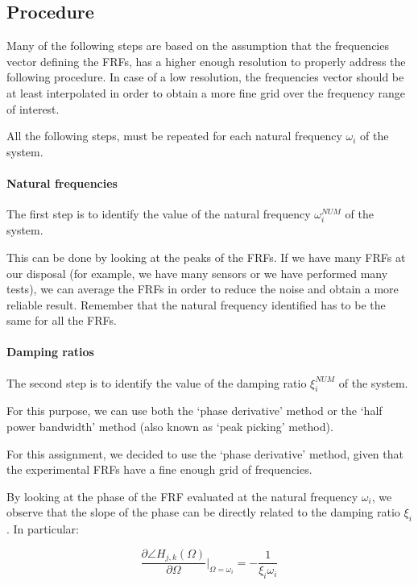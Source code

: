 \subsection{Procedure}
\label{subsec:procedure}

Many of the following steps are based on the assumption that the frequencies vector defining the FRFs, has a higher enough resolution to properly address the following procedure.
In case of a low resolution, the frequencies vector should be at least interpolated in order to obtain a more fine grid over the frequency range of interest.

All the following steps, must be repeated for each natural frequency $\omega_i$ of the system.

\paragraph{Natural frequencies}

The first step is to identify the value of the natural frequency $\omega_i^{NUM}$ of the system.

This can be done by looking at the peaks of the FRFs.
If we have many FRFs at our disposal (for example, we have many sensors or we have performed many tests), we can average the FRFs in order to reduce the noise and obtain a more reliable result.
Remember that the natural frequency identified has to be the same for all the FRFs.

\paragraph{Damping ratios}

The second step is to identify the value of the damping ratio $\xi_i^{NUM}$ of the system.

For this purpose, we can use both the `phase derivative' method or the `half power bandwidth' method (also known as `peak picking' method).

For this assignment, we decided to use the `phase derivative' method, given that the experimental FRFs have a fine enough grid of frequencies.

By looking at the phase of the FRF evaluated at the natural frequency $\omega_i$, we observe that the slope of the phase can be directly related to the damping ratio $\xi_i$.
In particular:

\begin{equation}
    \frac{\partial \angle H_{j, k}(\Omega)}{\partial \Omega} \biggl|_{\Omega = \omega_i} = - \frac{1}{\xi_i \omega_i}
    \label{eq:phase_derivative}
\end{equation}

